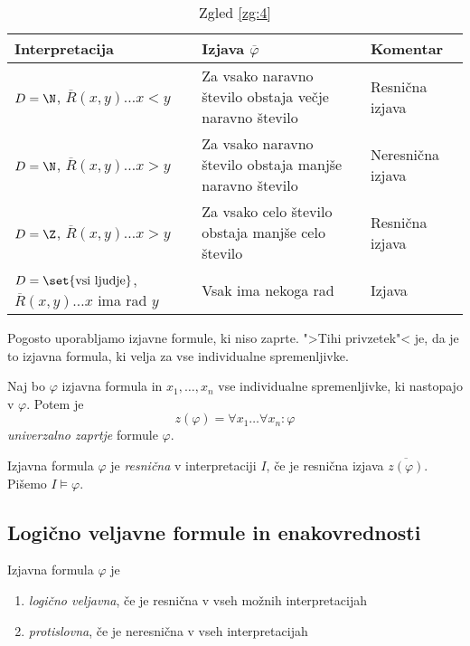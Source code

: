 \documentclass[12pt, a4paper]{article}
\begin{document}
\begin{table}[H]
\centering
\begin{tabular}{>{\raggedright}p{4.5cm}|p{6cm}|l}
Interpretacija & Izjava $\overline{\varphi}$ & Komentar \\
\hline 
$D=\N$, $\overline{R}(x,y)\dots x<y$ & Za vsako naravno število obstaja večje naravno število & Resnična izjava \\
$D=\N$, $\overline{R}(x,y)\dots x>y$ & Za vsako naravno število obstaja manjše naravno število  & Neresnična izjava \\
$D=\Z$, $\overline{R}(x,y)\dots x>y$ & Za vsako celo število obstaja manjše celo število  & Resnična izjava \\
$D=\set{\text{vsi ljudje}}$, $\overline{R}(x,y)\dots x$ ima rad $y$ & Vsak ima nekoga rad & Izjava \\
\end{tabular}
\caption{Zgled \ref{zg:4}}
\end{table}

Pogosto uporabljamo izjavne formule, ki niso zaprte. ">Tihi privzetek"< je, da je to izjavna formula, ki velja za vse individualne spremenljivke.
\begin{definicija}
Naj bo $\varphi$ izjavna formula in $x_1,\dots,x_n$ vse individualne spremenljivke, ki nastopajo v $\varphi$. Potem je
\[
z(\varphi)=\forall x_1\dots\forall x_n\colon \varphi
\]
\emph{univerzalno zaprtje} formule $\varphi$.
\end{definicija}

\begin{definicija}
Izjavna formula $\varphi$ je \emph{resnična} v interpretaciji $I$, če je resnična izjava $\overline{z(\varphi)}$. Pišemo $I\models\varphi$.
\end{definicija}

\newpage

\subsection{Logično veljavne formule in enakovrednosti}

\begin{okvir}
\begin{definicija}
Izjavna formula $\varphi$ je

\begin{enumerate}
\item \emph{logično veljavna}, če je resnična v vseh možnih interpretacijah
\item \emph{protislovna}, če je neresnična v vseh interpretacijah
\end{enumerate}
\end{definicija}
\end{okvir}
\end{document}
